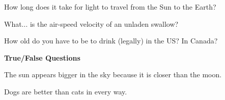\documentclass[10pt,answers,addpoints]{exam}
\begin{document}
\begin{questions}
\par\vspace{0.100000in}\begin{minipage}{\linewidth}
\vspace{.35cm}\question[2]
How long does it take for light to travel from the Sun to the Earth?
\vspace{.25cm}\setlength\answerlinelength{1in}
\answerline[8 minutes]
\end{minipage}


\par\vspace{0.100000in}\begin{minipage}{\linewidth}
\vspace{.35cm}\question[2]
What... is the air-speed velocity of an unladen swallow?
\vspace{.25cm}\setlength\answerlinelength{3in}
\end{minipage}


\par\vspace{0.100000in}\begin{minipage}{\linewidth}
\vspace{.35cm}\question[2]
How old do you have to be to drink (legally) in the US?  In Canada?
\vspace{.25cm}\setlength\answerlinelength{1in}
\answerline[21]
\answerline[18]
\end{minipage}





\newpage
\begin{center}
{\Large \textbf{True/False Questions}}
\end{center}

\par\vspace{0.100000in}\begin{minipage}{\linewidth}
\question[1]
The sun appears bigger in the sky because it is closer than the moon.
\setlength\answerlinelength{1in}
\answerline[False]

\medskip
\end{minipage}


\par\vspace{0.100000in}\begin{minipage}{\linewidth}
\question[1]
Dogs are better than cats in every way.
\setlength\answerlinelength{1in}
\answerline[True]


\end{minipage}
\end{questions}
\end{document}
